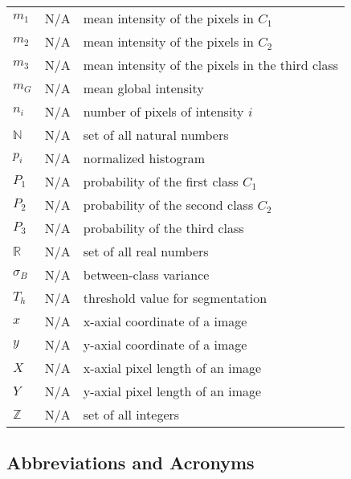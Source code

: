 \documentclass[12pt]{article}
\begin{document}
\begin{longtable*}{l l p{12cm}}
\\
$m_{1}$ & N/A & mean intensity of the pixels in $C_{1}$
\\
$m_{2}$ & N/A & mean intensity of the pixels in $C_{2}$
\\
$m_{3}$ & N/A & mean intensity of the pixels in the third class
\\
$m_{G}$ & N/A & mean global intensity
\\
$n_{i}$ & N/A & number of pixels of intensity $i$
\\
$\mathbb{N}$ & N/A & set of all natural numbers
\\
$p_{i}$ & N/A & normalized histogram
\\
$P_{1}$ & N/A & probability of the first class $C_{1}$
\\
$P_{2}$ & N/A & probability of the second class $C_{2}$
\\
$P_{3}$ & N/A & probability of the third class
\\
$\mathbb{R}$ & N/A & set of all real numbers
\\
$\sigma_{B}$ & N/A & between-class variance
\\
$T_{h}$ & N/A & threshold value for segmentation
\\
$x$ & N/A & x-axial coordinate of a image
\\
$y$ & N/A & y-axial coordinate of a image
\\
$X$ & N/A & x-axial pixel length of an image
\\
$Y$ & N/A & y-axial pixel length of an image
\\
$\mathbb{Z}$ & N/A & set of all integers
\\ 
\bottomrule
\end{longtable*}

\subsection{Abbreviations and Acronyms}
\end{document}
